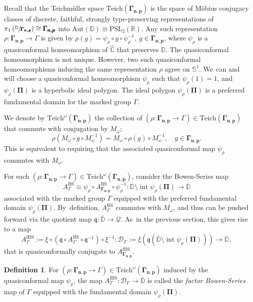\documentclass[JEP,XML,SOM,Unicode,NoFloatCountersInSection,published]{cedram}
\let\faktor\sfrac
\theoremstyle{definition}
\newtheorem{definition}[lemma]{Definition}
\theoremstyle{remark}
\newcommand{\C}{\mathbb{C}}
\newcommand{\D}{\mathbb{D}}
\newcommand{\R}{\mathbb{R}}
\DeclareMathOperator{\Int}{int}
\begin{document}
Recall that the Teichmüller space $\mathrm{Teich}(\pmb{\Gamma_{n,p}})$ is the space of Möbius conjugacy classes of discrete, faithful, strongly type-preserving representations of $\pi_1\left(\faktor{\D}{\pmb{\Gamma_{n,p}}}\right)\cong \pmb{\Gamma_{n,p}}$ into $\mathrm{Aut}(\D)\cong \mathrm{PSL}_2(\R)$. Any such representation $\rho: \pmb{\Gamma_{n,p}}\to\Gamma$ is given by $\rho(g)=\psi_\rho\circ g\circ\psi_\rho^{-1},\ g\in\pmb{\Gamma_{n,p}}$, where $\psi_\rho$ is a quasiconformal homeomorphism of $\widehat{\C}$ that preserves $\D$.
The quasiconformal homeomorphism is not unique. However,
two such quasiconformal homeomorphisms inducing the same representation $\rho$ agree on $\mathbb{S}^1$. We~can and will choose a quasiconformal homeomorphism $\psi_\rho$ such that $\psi_\rho(1)=1$, and $\psi_\rho(\pmb{\Pi})$ is a hyperbolic ideal polygon.
The ideal polygon $\psi_\rho(\pmb{\Pi})$ is a preferred fundamental domain for the marked group $\Gamma$.

We denote by $\mathrm{Teich}^\omega(\pmb{\Gamma_{n,p}})$ the collection of $(\rho: \pmb{\Gamma_{n,p}}\to\Gamma)\in\mathrm{Teich}(\pmb{\Gamma_{n,p}})$ that commute with conjugation by $M_\omega$; \ie
\[
\rho(M_\omega\circ g\circ M_\omega^{-1})=M_\omega\circ \rho(g)\circ M_\omega^{-1},\quad g\in\pmb{\Gamma_{n,p}}.
\]
This is equivalent to requiring that the associated quasiconformal map $\psi_\rho$ commutes with $M_\omega$.

For each $(\rho: \pmb{\Gamma_{n,p}}\to\Gamma)\in \mathrm{Teich}^\omega(\pmb{\Gamma_{n,p}})$, consider the Bowen-Series map
\[
A_{\Gamma}^{\mathrm{BS}} \equiv\psi_\rho\circ A_{\pmb{\Gamma_{n,p}}}^{\mathrm{BS}}\circ\psi_\rho^{-1}:\overline{\D}\setminus \Int{\psi_\rho(\pmb{\Pi})}\to\overline{\D}
\]
associated with the marked group $\Gamma$ equipped with the preferred fundamental domain $\psi_\rho(\pmb{\Pi})$. By~definition, $A_\Gamma^{\mathrm{BS}}$ commutes with $M_\omega$, and thus can be pushed forward via the quotient map $\mathfrak{q}:\overline{\D}\to\mathcal{Q}$. As~in the previous section, this gives rise to a map
\[
A_{\Gamma}^{\mathrm{fBS}}:= \xi\circ \left(\mathfrak{q}\circ A_{\Gamma}^{\mathrm{BS}} \circ\mathfrak{q}^{-1}\right) \circ \xi^{-1}: \mathcal{D}_{\Gamma}:= \xi(\mathfrak{q}(\overline{\D}\setminus \Int{\psi_\rho(\pmb{\Pi})}))\to \overline{\D},
\]
that is quasiconformally conjugate to $A_{\pmb{\Gamma_{n,p}}}^{\mathrm{fBS}}$.

\begin{definition}\label{factor_bs_gen_def}
For $(\rho: \pmb{\Gamma_{n,p}}\to\Gamma)\in \mathrm{Teich}^\omega(\pmb{\Gamma_{n,p}})$ induced by the quasiconformal map $\psi_\rho$, the map $A_{\Gamma}^{\mathrm{fBS}}: \mathcal{D}_{\Gamma}\to \overline{\D}$ is called the \emph{factor Bowen-Series} map of $\Gamma$ equipped with the fundamental domain $\psi_\rho(\pmb{\Pi})$.
\end{definition}
\end{document}
